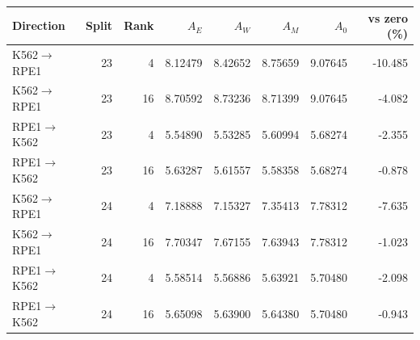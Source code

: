 \begin{tabular}{lrrrrrrr}
\toprule
Direction & Split & Rank & $A_E$ & $A_W$ & $A_M$ & $A_0$ & vs zero (\%) \\
\midrule
K562$\to$RPE1 & 23 & 4 & 8.12479 & 8.42652 & 8.75659 & 9.07645 & -10.485 \\
K562$\to$RPE1 & 23 & 16 & 8.70592 & 8.73236 & 8.71399 & 9.07645 & -4.082 \\
RPE1$\to$K562 & 23 & 4 & 5.54890 & 5.53285 & 5.60994 & 5.68274 & -2.355 \\
RPE1$\to$K562 & 23 & 16 & 5.63287 & 5.61557 & 5.58358 & 5.68274 & -0.878 \\
K562$\to$RPE1 & 24 & 4 & 7.18888 & 7.15327 & 7.35413 & 7.78312 & -7.635 \\
K562$\to$RPE1 & 24 & 16 & 7.70347 & 7.67155 & 7.63943 & 7.78312 & -1.023 \\
RPE1$\to$K562 & 24 & 4 & 5.58514 & 5.56886 & 5.63921 & 5.70480 & -2.098 \\
RPE1$\to$K562 & 24 & 16 & 5.65098 & 5.63900 & 5.64380 & 5.70480 & -0.943 \\
\bottomrule
\end{tabular}
